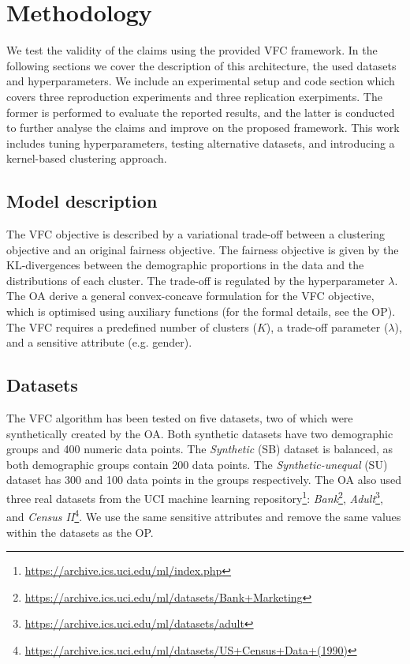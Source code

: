 \section{Methodology}
We test the validity of the claims using the provided VFC framework. In the following sections we cover the description of this architecture, the used datasets and hyperparameters. We include an experimental setup and code section which covers three reproduction experiments and three replication exerpiments. The former is performed to evaluate the reported results, and the latter is conducted to further analyse the claims and improve on the proposed framework. This work includes tuning hyperparameters, testing alternative datasets, and introducing a kernel-based clustering approach.

\subsection{Model description}

The VFC objective is described by a variational trade-off between a clustering objective and an original fairness objective. The fairness objective is given by the KL-divergences between the demographic proportions in the data and the distributions of each cluster. The trade-off is regulated by the hyperparameter $\lambda$. The OA derive a general convex-concave formulation for the VFC objective, which is optimised using auxiliary functions (for the formal details, see the OP). The VFC requires a predefined number of clusters ($K$), a trade-off parameter ($\lambda$), and a sensitive attribute (e.g. gender).





\subsection{Datasets}
The VFC algorithm has been tested on five datasets, two of which were synthetically created by the OA. Both synthetic datasets have two demographic groups and 400 numeric data points. The \textit{Synthetic} (SB) dataset is balanced, as both demographic groups contain 200 data points. The \textit{Synthetic-unequal} (SU) dataset has 300 and 100 data points in the groups respectively. The OA also used three real datasets from the UCI machine learning repository\footnote{\url{https://archive.ics.uci.edu/ml/index.php}}: \textit{Bank}\footnote{\url{https://archive.ics.uci.edu/ml/datasets/Bank+Marketing}}, \textit{Adult}\footnote{\url{https://archive.ics.uci.edu/ml/datasets/adult}}, and \textit{Census II}\footnote{\url{https://archive.ics.uci.edu/ml/datasets/US+Census+Data+(1990)}}. We use the same sensitive attributes and remove the same values within the datasets as the OP. 

